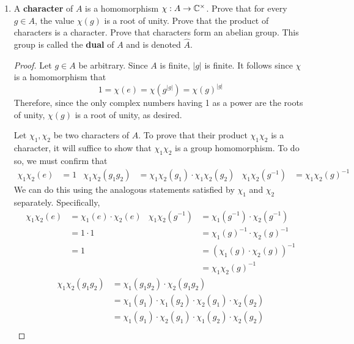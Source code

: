 \documentclass[../psets.tex]{subfiles}
\begin{document}
\begin{enumerate}
\begin{enumerate}
        \item A \textbf{character} of $A$ is a homomorphism $\chi:A\to\mathbb{C}^\times$. Prove that for every $g\in A$, the value $\chi(g)$ is a root of unity. Prove that the product of characters is a character. Prove that characters form an abelian group. This group is called the \textbf{dual} of $A$ and is denoted $\widehat{A}$.
        \begin{proof}
            Let $g\in A$ be arbitrary. Since $A$ is finite, $|g|$ is finite. It follows since $\chi$ is a homomorphism that
            \begin{equation*}
                1 = \chi(e) = \chi(g^{|g|}) = \chi(g)^{|g|}
            \end{equation*}
            Therefore, since the only complex numbers having 1 as a power are the roots of unity, $\chi(g)$ is a root of unity, as desired.\par\smallskip
            Let $\chi_1,\chi_2$ be two characters of $A$. To prove that their product $\chi_1\chi_2$ is a character, it will suffice to show that $\chi_1\chi_2$ is a group homomorphism. To do so, we must confirm that
            \begin{align*}
                \chi_1\chi_2(e) &= 1&
                \chi_1\chi_2(g_1g_2) &= \chi_1\chi_2(g_1)\cdot\chi_1\chi_2(g_2)&
                \chi_1\chi_2(g^{-1}) &= \chi_1\chi_2(g)^{-1}
            \end{align*}
            We can do this using the analogous statements satisfied by $\chi_1$ and $\chi_2$ separately. Specifically,
            \begin{align*}
                \chi_1\chi_2(e) &= \chi_1(e)\cdot\chi_2(e)&
                    \chi_1\chi_2(g^{-1}) &= \chi_1(g^{-1})\cdot\chi_2(g^{-1})\\
                &= 1\cdot 1&
                    &= \chi_1(g)^{-1}\cdot\chi_2(g)^{-1}\\
                &= 1&
                    &= (\chi_1(g)\cdot\chi_2(g))^{-1}\\
                &&
                    &= \chi_1\chi_2(g)^{-1}
            \end{align*}
            \begin{align*}
                \chi_1\chi_2(g_1g_2) &= \chi_1(g_1g_2)\cdot\chi_2(g_1g_2)\\
                &= \chi_1(g_1)\cdot\chi_1(g_2)\cdot\chi_2(g_1)\cdot\chi_2(g_2)\\
                &= \chi_1(g_1)\cdot\chi_2(g_1)\cdot\chi_1(g_2)\cdot\chi_2(g_2)\\

\end{align*}
\end{proof}
\end{enumerate}
\end{enumerate}
\end{document}
